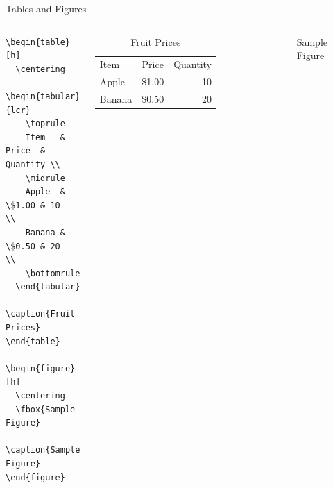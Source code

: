 \documentclass[aspectratio=1610]{beamer}
\begin{document}
\begin{frame}[fragile]{Tables and Figures}
  \begin{columns}[T]
      \begin{lstlisting}
\begin{table}[h]
  \centering
  \begin{tabular}{lcr}
    \toprule
    Item   & Price  & Quantity \\
    \midrule
    Apple  & \$1.00 & 10       \\
    Banana & \$0.50 & 20       \\
    \bottomrule
  \end{tabular}
  \caption{Fruit Prices}
\end{table}

\begin{figure}[h]
  \centering
  \fbox{Sample Figure}
  \caption{Sample Figure}
\end{figure}
      \end{lstlisting}
\begin{table}[h]
  \centering
  \begin{tabular}{lcr}
    Item   & Price  & Quantity \\
    Apple  & \$1.00 & 10       \\
    Banana & \$0.50 & 20       \\
  \end{tabular}
  \caption{Fruit Prices}
\end{table}

\begin{figure}[h]
  \centering
  \caption{Sample Figure}
\end{figure}
  \end{columns}
\end{frame}

% 
% 
% 
% 
% 
% 
\end{document}
